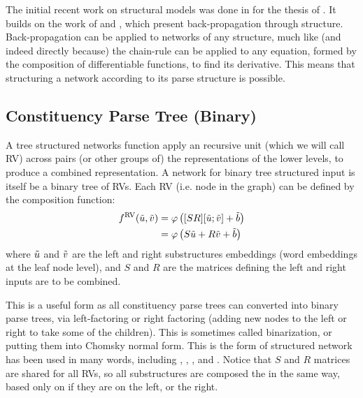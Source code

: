 \documentclass[12pt,parskip]{komatufte}
\begin{document}
The initial recent work on structural models was done in for the thesis of .
It builds on the work of  and , which present back-propagation through structure.
Back-propagation can be applied to networks of any structure, much like (and indeed directly because) the chain-rule can be applied to any equation, formed by the composition of differentiable functions, to find its derivative.
This means that structuring a network according to its parse structure is possible.

\subsection{Constituency Parse Tree (Binary)}
A tree structured networks function apply an recursive unit (which we will call RV) across pairs (or other groups of) the representations of the lower levels, to produce a combined representation.
A network for binary tree structured input is itself be a binary tree of RVs.
Each RV (i.e. node in the graph) can be defined by the composition function:
\begin{align}
	\d f_{RV}(\v u, \v v) &= \varphi\left( [S R][\v u;\v v] + \v b \right) \\ \label{equ:rnn1}
			     &= \varphi\left( S\v u +R\v v + \v b \right)
\end{align}
where $\tilde{u}$ and $\tilde{v}$ are the left and right substructures embeddings (word embeddings at the leaf node level), and $S$ and $R$ are the matrices defining the left and right inputs are to be combined.


This is a useful form as all constituency parse trees can converted into binary parse trees, via left-factoring or right factoring (adding new nodes to the left or right to take some of the children).
This is sometimes called binarization, or putting them into  Chomsky normal form.
This is the form of structured network has been used in many words, including , \textcite{SocherEtAl2011:RAE},  \textcite{SocherEtAl2011:PoolRAE},
 \textcite{Socher2011ParsingPhrases} and \textcite{zhang2014BRAE}.
Notice that $S$ and $R$ matrices are shared for all RVs, so all substructures are composed the in the same way, based only on if they are on the left, or the right.
\end{document}
